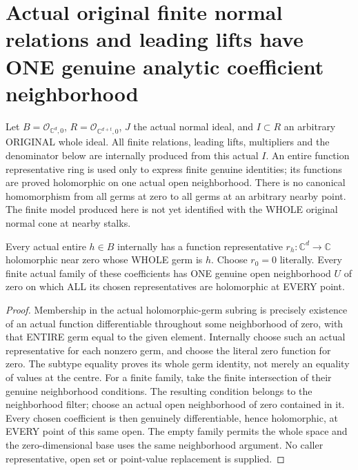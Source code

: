 \section{Actual original finite normal relations and leading lifts have ONE genuine analytic coefficient neighborhood}
Let $B=\mathcal O_{\mathbb C^d,0}$, $R=\mathcal O_{\mathbb C^{d+t},0}$,
$J$ the actual normal ideal, and $I\subset R$ an arbitrary ORIGINAL whole
ideal. All finite relations, leading lifts, multipliers and the denominator
below are internally produced from this actual $I$. An entire function
representative ring is used only to express finite genuine identities;
its functions are proved holomorphic on one actual open neighborhood.
There is no canonical homomorphism from all germs at zero to all germs at
an arbitrary nearby point. The finite model produced here is not yet
identified with the WHOLE original normal cone at nearby stalks.

\begin{lemma}
\label{hir:relative-normal-analytic-coefficients-common-open}
\leanok
Every actual entire $h\in B$ internally has a function representative
$r_h:\mathbb C^d\to\mathbb C$ holomorphic near zero whose WHOLE germ is $h$.
Choose $r_0=0$ literally. Every finite actual family of these coefficients
has ONE genuine open neighborhood $U$ of zero on which ALL its chosen
representatives are holomorphic at EVERY point.
\end{lemma}
\begin{proof}
Membership in the actual holomorphic-germ subring is precisely existence
of an actual function differentiable throughout some neighborhood of zero,
with that ENTIRE germ equal to the given element. Internally choose such
an actual representative for each nonzero germ, and choose the literal
zero function for zero. The subtype equality proves its whole germ
identity, not merely an equality of values at the centre. For a finite
family, take the finite intersection of their genuine neighborhood
conditions. The resulting condition belongs to the neighborhood filter;
choose an actual open neighborhood of zero contained in it. Every chosen
coefficient is then genuinely differentiable, hence holomorphic, at EVERY
point of this same open. The empty family permits the whole space and the
zero-dimensional base uses the same neighborhood argument. No caller
representative, open set or point-value replacement is supplied.
\end{proof}

